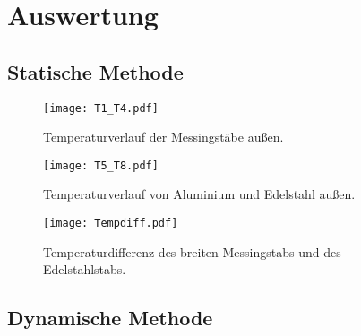 \section{Auswertung}
\label{sec:Auswertung}

\subsection{Statische Methode}
\label{sec:stat}

\begin{figure}
  \centering
  \texttt{[image: T1\_T4.pdf]}
  \caption{Temperaturverlauf der Messingstäbe außen.}
  \label{fig:T1T4}
\end{figure}

\begin{figure}
  \centering
  \texttt{[image: T5\_T8.pdf]}
  \caption{Temperaturverlauf von Aluminium und Edelstahl außen.}
  \label{fig:T5T8}
\end{figure}

\begin{figure}
  \centering
  \texttt{[image: Tempdiff.pdf]}
  \caption{Temperaturdifferenz des breiten Messingstabs und des Edelstahlstabs.}
  \label{fig:plot}
\end{figure}

\subsection{Dynamische Methode}
\label{dynam}